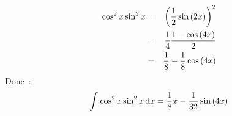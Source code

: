 \documentclass{magnoliaold}
\begin{document}
\begin{itemize}
\begin{exoUnique}
\begin{sol}
\begin{eqnarray*}
    \cos^2 x\sin^2 x&=&\left(\frac{1}{2}\sin\left(2x\right)\right)^2\\
     &=&\frac{1}{4}\frac{1-\cos\left(4x\right)}{2}\\
     &=&\frac{1}{8}-\frac{1}{8}\cos\left(4x\right)
    \end{eqnarray*}
    Donc~:
    $$\int_{}^{} \cos^2 x\sin^2 x\,\text{d}x=\frac{1}{8}x-\frac{1}{32}\sin\left(4x\right)$$
    \end{sol}
\end{exoUnique}

\end{itemize}
\end{document}

